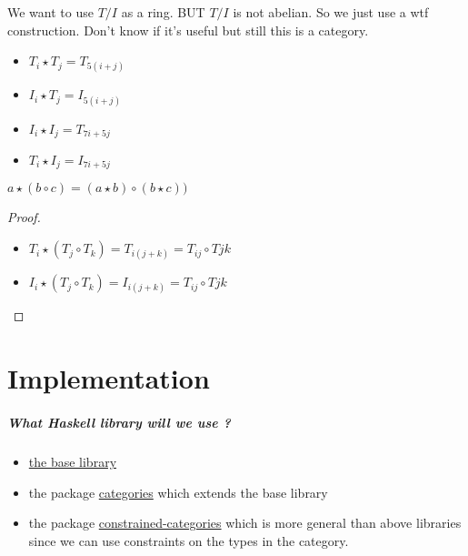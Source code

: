 \documentclass{report}
\begin{document}
We want to use $T/I$ as a ring. BUT $T/I$ is not abelian. So we just use a wtf construction. Don't know if it's useful but still this is a category.
\begin{itemize}
    \item $T_i \star T_j = T_{5(i + j)}$
    \item $I_i \star T_j = I_{5(i + j)}$
    \item $I_i \star I_j = T_{7i + 5j}$
    \item $T_i \star I_j = I_{7i + 5j}$
\end{itemize}



\begin{prop}
    $a \star (b \circ c) = (a \star b) \circ (b \star c)) $
\end{prop}
\begin{proof}
    \begin{itemize}
        \item $T_i \star (T_j \circ T_k) = T_{i(j+k)} = T_{ij}\circ T{jk}$
        \item $I_i \star (T_j \circ T_k) = I_{i(j+k)} = T_{ij}\circ T{jk}$
    \end{itemize}
\end{proof}


\chapter{Implementation}
\paragraph{What Haskell library will we use ?}
\begin{itemize}
    \item \href{http://hackage.haskell.org/package/base-4.7.0.1/docs/Control-Category.html}{the base library}
    \item the package \href{https://hackage.haskell.org/package/categories}{categories} which extends the base library
    \item the package \href{https://hackage.haskell.org/package/constrained-categories}{constrained-categories} which is more general than above libraries since we can use constraints on the types in the category.
\end{itemize}
\newpage



\end{document}
